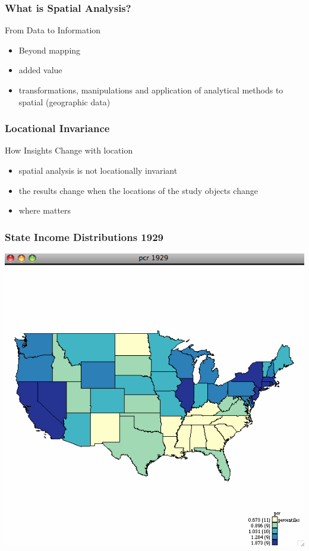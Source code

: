 \documentclass[nototal]{beamer}
\begin{document}
\begin{frame}
	\frametitle{What is Spatial Analysis?}
 
\begin{block}{From Data to Information}
 \begin{itemize}
 \item  \alert{Beyond} mapping
 \item  \alert{added value}
 \item  transformations, manipulations and application of analytical methods to spatial (geographic data)
 \end{itemize}
 \end{block} \end{frame} 

\begin{frame}
	\frametitle{Locational Invariance}
 
\begin{block}{How Insights  Change with location}
 \begin{itemize}
 \item  spatial analysis is \alert{not} locationally invariant
 \item  the results change when the locations of the study objects change
 \item  \alert{where} matters
 \end{itemize}
 \end{block} \end{frame} 

\begin{frame}
	\frametitle{State Income Distributions 1929}
 \begin{center}
 \includegraphics[width=.65\linewidth]{income29.png}
  \end{center}
 \end{frame} 
\end{document}
